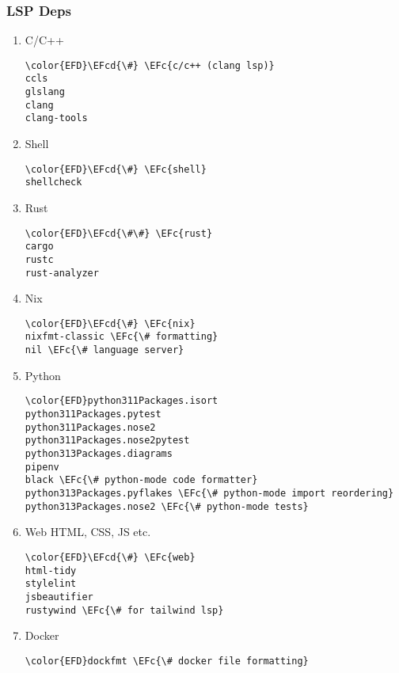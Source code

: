 \documentclass[14pt]{article}
\newcommand{\EFc}[1]{\textcolor{EFc}{#1}} %
\newcommand{\EFcd}[1]{\textcolor{EFcd}{#1}} %
\begin{document}
\subsubsection{LSP Deps}
\label{sec:org002cb49}
\begin{enumerate}
\item C/C++
\label{sec:org7b2a097}
\begin{Code}
\begin{Verbatim}
\color{EFD}\EFcd{\#} \EFc{c/c++ (clang lsp)}
ccls
glslang
clang
clang-tools

\end{Verbatim}
\end{Code}
\item Shell
\label{sec:orgaeec996}
\begin{Code}
\begin{Verbatim}
\color{EFD}\EFcd{\#} \EFc{shell}
shellcheck

\end{Verbatim}
\end{Code}
\item Rust
\label{sec:orgf20c110}
\begin{Code}
\begin{Verbatim}
\color{EFD}\EFcd{\#\#} \EFc{rust}
cargo
rustc
rust-analyzer

\end{Verbatim}
\end{Code}
\item Nix
\label{sec:org2dad537}
\begin{Code}
\begin{Verbatim}
\color{EFD}\EFcd{\#} \EFc{nix}
nixfmt-classic \EFc{\# formatting}
nil \EFc{\# language server}

\end{Verbatim}
\end{Code}
\item Python
\label{sec:orgdeea716}
\begin{Code}
\begin{Verbatim}
\color{EFD}python311Packages.isort
python311Packages.pytest
python311Packages.nose2
python311Packages.nose2pytest
python313Packages.diagrams
pipenv
black \EFc{\# python-mode code formatter}
python313Packages.pyflakes \EFc{\# python-mode import reordering}
python313Packages.nose2 \EFc{\# python-mode tests}
\end{Verbatim}
\end{Code}
\item Web
\label{sec:org1ff5dc0}
HTML, CSS, JS etc.
\begin{Code}
\begin{Verbatim}
\color{EFD}\EFcd{\#} \EFc{web}
html-tidy
stylelint
jsbeautifier
rustywind \EFc{\# for tailwind lsp}

\end{Verbatim}
\end{Code}
\item Docker
\label{sec:org96680fd}
\begin{Code}
\begin{Verbatim}
\color{EFD}dockfmt \EFc{\# docker file formatting}

\end{Verbatim}
\end{Code}
\end{enumerate}
\end{document}
